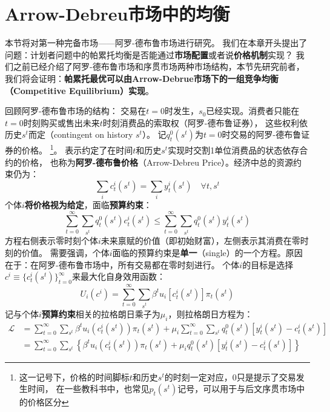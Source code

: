 
\section{Arrow-Debreu市场中的均衡}  \label{sec-ad-market}

本节将对第一种完备市场——阿罗-德布鲁市场进行研究。
我们在本章开头提出了问题：计划者问题中的帕累托均衡是否能通过\textbf{市场配置}或者说\textbf{价格机制}实现？
我们之前已经介绍了阿罗-德布鲁市场和序贯市场两种市场结构，本节先研究前者，
我们将会证明：\textbf{帕累托最优可以由Arrow-Debrue市场下的一组竞争均衡（Competitive Equilibrium）实现}。

回顾阿罗-德布鲁市场的结构：
交易在$t=0$时发生，$s_0$已经实现。消费者只能在$t=0$时刻购买或售出未来$t$时刻消费品的索取权（阿罗-德布鲁证券），
这些权利依历史$s^t$而定（contingent on history $s^t$）。
记$q_t^0\left(s^t\right)$为$t=0$时交易的阿罗-德布鲁证券的价格。
\footnote{这一记号下，价格的时间脚标$t$和历史$s^t$的时刻一定对应，$0$只是提示了交易发生时间，
在一些教科书中，也常见$p_t\left(s^t\right)$记号，可以用于与后文序贯市场中的价格区分}。
表示约定了在时间$t$和历史$s^t$实现时交割1单位消费品的状态依存合约的价格，
也称为\textbf{阿罗-德布鲁价格}（Arrow-Debreu Price）。经济中总的资源约束仍为：
\begin{equation}    \label{eq-ad-rc}
    \sum_i c_t^i\left(s^t\right) = \sum_i y_t^i\left(s^t\right) \quad \forall  t, s^t
\end{equation}
个体$i$\textbf{将价格视为给定}，面临\textbf{预算约束}：
\begin{equation}    \label{eq-ad-bc}
    \sum_{t=0}^{\infty} \sum_{s^t} q_t^0\left(s^t\right) c_t^i\left(s^t\right) 
        \leq \sum_{t=0}^{\infty} \sum_{s^t} q_t^0\left(s^t\right) y_t^i\left(s^t\right)
\end{equation}
方程右侧表示零时刻个体$i$未来禀赋的价值（即初始财富），左侧表示其消费在零时刻的价值。
需要强调，个体$i$面临的预算约束是\textbf{单一}（single）的一个方程。原因在于：在阿罗-德布鲁市场中，所有交易都在零时刻进行。
个体$i$的目标是选择$c^i\equiv \{c_t^i\left(s^t\right)\}_{t=0}^{\infty}$来最大化自身效用函数：
\begin{equation}    \label{eq-ad-preference-i}
    U_i\left(c^i\right)=\sum_{t=0}^{\infty} \sum_{s^t} \beta^t u_i\left[c_t^i\left(s^t\right)\right] \pi_t\left(s^t\right)
\end{equation}
记与个体$i$\textbf{预算约束}相关的拉格朗日乘子为$\mu_i$，则拉格朗日方程为：
\begin{equation*}
    \begin{aligned}
        \mathcal{L} &=\sum_{t=0}^{\infty} \sum_{s^t} \beta^t u_i\left(c_t^i\left(s^t\right)\right) \pi_t\left(s^t\right) 
            +\mu_i \sum_{t=0}^{\infty} \sum_{s^t} q_t^0\left(s^t\right)\left[y_t^i\left(s^t\right)-c_t^i\left(s^t\right)\right] \\
            &= \sum_{t=0}^{\infty} \sum_{s^t}\left\{\beta^t u_i\left(c_t^i\left(s^t\right)\right) \pi_t\left(s^t\right)
                +\mu_i q_t^0\left(s^t\right)\left[y_t^i\left(s^t\right)-c_t^i\left(s^t\right)\right]\right\}
    \end{aligned}
\end{equation*}
